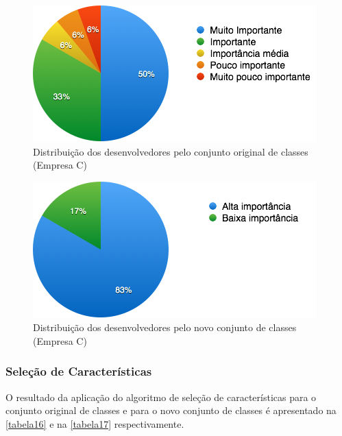 \begin{figure}[p]
	\centering
	\includegraphics[width=\textwidth]{figs/empresa_c/imagem-classe-original.png}
	\caption{\label{fig_15}Distribuição dos desenvolvedores pelo conjunto original de classes (Empresa C)}
\end{figure}

\begin{figure}[p]
	\centering
	\includegraphics[width=\textwidth]{figs/empresa_c/imagem-classe-alternativa.png}
	\caption{\label{fig_16}Distribuição dos desenvolvedores pelo novo conjunto de classes (Empresa C)}
\end{figure}

\subsubsection{Seleção de Características}
O resultado da aplicação do algoritmo de seleção de características para o conjunto original de classes e para o novo conjunto de classes é apresentado na \autoref{tabela16} e na \autoref{tabela17} respectivamente.

